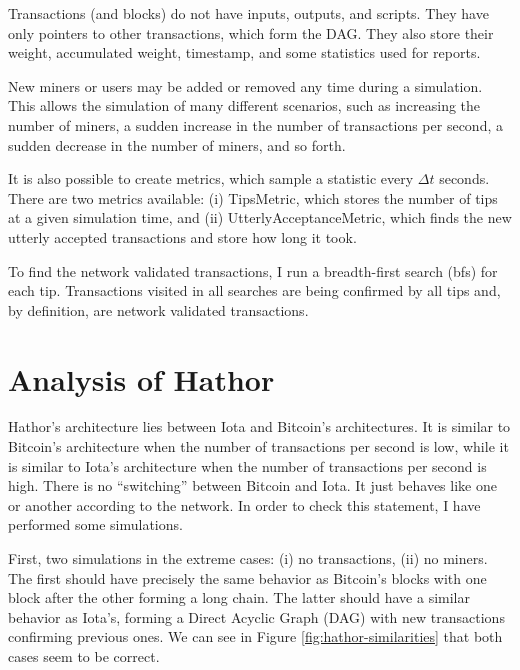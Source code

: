 Transactions (and blocks) do not have inputs, outputs, and scripts. They have only pointers to other transactions, which form the DAG. They also store their weight, accumulated weight, timestamp, and some statistics used for reports.

New miners or users may be added or removed any time during a simulation. This allows the simulation of many different scenarios, such as increasing the number of miners, a sudden increase in the number of transactions per second, a sudden decrease in the number of miners, and so forth.

It is also possible to create metrics, which sample a statistic every $\Delta t$ seconds. There are two metrics available: (i) TipsMetric, which stores the number of tips at a given simulation time, and (ii) UtterlyAcceptanceMetric, which finds the new utterly accepted transactions and store how long it took.

To find the network validated transactions, I run a breadth-first search (bfs) for each tip. Transactions visited in all searches are being confirmed by all tips and, by definition, are network validated transactions.



\section{Analysis of Hathor}


Hathor's architecture lies between Iota and Bitcoin's architectures. It is similar to Bitcoin's architecture when the number of transactions per second is low, while it is similar to Iota's architecture when the number of transactions per second is high. There is no ``switching'' between Bitcoin and Iota. It just behaves like one or another according to the network. In order to check this statement, I have performed some simulations.

First, two simulations in the extreme cases: (i) no transactions, (ii) no miners. The first should have precisely the same behavior as Bitcoin's blocks with one block after the other forming a long chain. The latter should have a similar behavior as Iota's, forming a Direct Acyclic Graph (DAG) with new transactions confirming previous ones. We can see in Figure \ref{fig:hathor-similarities} that both cases seem to be correct.

